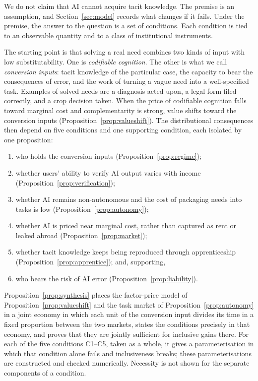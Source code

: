 \documentclass[12pt]{article}
\theoremstyle{remark}
\begin{document}
We do not claim that AI cannot acquire tacit knowledge. The premise is an assumption, and Section~\ref{sec:model} records what changes if it fails. Under the premise, the answer to the question is a set of conditions. Each condition is tied to an observable quantity and to a class of institutional instruments.

The starting point is that solving a real need combines two kinds of input with low substitutability. One is \emph{codifiable cognition}. The other is what we call \emph{conversion inputs}: tacit knowledge of the particular case, the capacity to bear the consequences of error, and the work of turning a vague need into a well-specified task. Examples of solved needs are a diagnosis acted upon, a legal form filed correctly, and a crop decision taken. When the price of codifiable cognition falls toward marginal cost and complementarity is strong, value shifts toward the conversion inputs (Proposition~\ref{prop:valueshift}). The distributional consequences then depend on five conditions and one supporting condition, each isolated by one proposition:
\begin{enumerate}[label=(\arabic*),leftmargin=2em,itemsep=0pt]
\item who holds the conversion inputs (Proposition~\ref{prop:regime});
\item whether users' ability to verify AI output varies with income (Proposition~\ref{prop:verification});
\item whether AI remains non-autonomous and the cost of packaging needs into tasks is low (Proposition~\ref{prop:autonomy});
\item whether AI is priced near marginal cost, rather than captured as rent or leaked abroad (Proposition~\ref{prop:market});
\item whether tacit knowledge keeps being reproduced through apprenticeship (Proposition~\ref{prop:apprentice}); and, supporting,
\item who bears the risk of AI error (Proposition~\ref{prop:liability}).
\end{enumerate}
Proposition~\ref{prop:synthesis} places the factor-price model of Proposition~\ref{prop:valueshift} and the task market of Proposition~\ref{prop:autonomy} in a joint economy in which each unit of the conversion input divides its time in a fixed proportion between the two markets, states the conditions precisely in that economy, and proves that they are jointly sufficient for inclusive gains there. For each of the five conditions C1--C5, taken as a whole, it gives a parameterisation in which that condition alone fails and inclusiveness breaks; these parameterisations are constructed and checked numerically. Necessity is not shown for the separate components of a condition.
\end{document}
